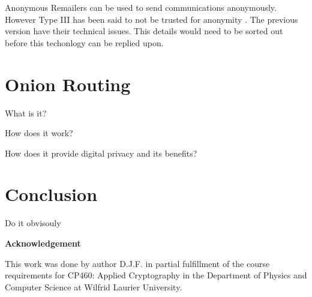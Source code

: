 \documentclass[12pt]{article}
\begin{document}
Anonymous Remailers can be used to send communications anonymously. However Type III  has been said to not be trusted for anonymity \cite{GoldbertTwo}. The previous version have their technical issues. This details would need to be sorted out before this techonlogy can be replied upon.

\section{Onion Routing}\label{}
What is it?

How does it work?

How does it provide digital privacy and its benefits?

\section{Conclusion}\label{sec:conclusion}
Do it obvisouly

\begin{center}
{\bf Acknowledgement}
\end{center}
This work was done by author D.J.F. in partial fulfillment of the course requirements for CP460: Applied Cryptography in the Department of Physics and Computer Science at Wilfrid Laurier University.
\end{document}
